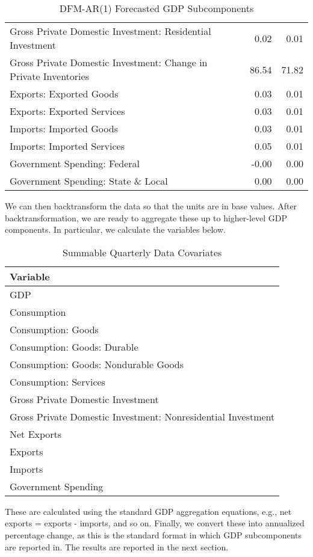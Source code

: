 \documentclass[11pt, letterpaper]{article}\usepackage[]{graphicx}\usepackage[]{color}
\begin{document}
\begin{table}[H]
\begin{tabular}{lrr}
  Gross Private Domestic Investment: Residential Investment & 0.02 & 0.01 \\ 
  Gross Private Domestic Investment: Change in Private Inventories & 86.54 & 71.82 \\ 
  Exports: Exported Goods & 0.03 & 0.01 \\ 
  Exports: Exported Services & 0.03 & 0.01 \\ 
  Imports: Imported Goods & 0.03 & 0.01 \\ 
  Imports: Imported Services & 0.05 & 0.01 \\ 
  Government Spending: Federal & -0.00 & 0.00 \\ 
  Government Spending: State \& Local & 0.00 & 0.00 \\ 
   \hline
\end{tabular}
\endgroup
\caption{DFM-AR(1) Forecasted GDP Subcomponents} 
\end{table}


We can then backtransform the data so that the units are in base values. After backtransformation, we are ready to aggregate these up to higher-level GDP components. In particular, we calculate the variables below.
\begin{table}[H]
\centering
\begingroup\scriptsize
\begin{tabular}{l}
  \hline
Variable \\ 
  \hline
GDP \\ 
  Consumption \\ 
  Consumption: Goods \\ 
  Consumption: Goods: Durable \\ 
  Consumption: Goods: Nondurable Goods \\ 
  Consumption: Services \\ 
  Gross Private Domestic Investment \\ 
  Gross Private Domestic Investment: Nonresidential Investment \\ 
  Net Exports \\ 
  Exports \\ 
  Imports \\ 
  Government Spending \\ 
   \hline
\end{tabular}
\endgroup
\caption{Summable Quarterly Data Covariates} 
\end{table}

These are calculated using the standard GDP aggregation equations, e.g., net exports = exports - imports, and so on.
Finally, we convert these into annualized percentage change, as this is the standard format in which GDP subcomponents are reported in. The results are reported in the next section.
\end{document}
